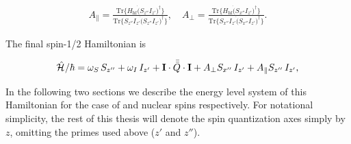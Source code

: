 \begin{align}
    A_\parallel = \frac{\text{Tr}\{ H_\text{hf} \dot (S_{z''}I_{z'})^\dagger\}}{\text{Tr}\{ S_{z''}I_{z'}\dot( S_{z''}I_{z'})^\dagger \}},  \quad A_\perp = \frac{\text{Tr}\{ H_\text{hf} \dot ( S_{x''}I_{z'})^\dagger\}}{\text{Tr}\{  S_{x''}I_{z'}\dot( S_{x''}I_{z'})^\dagger \}}.
\end{align} 

The final spin-1/2 Hamiltonian is

\begin{equation}
    \hat{\mathcal{H}}_{\text{}} / \hbar = \omega_S \, S_{z''} + \omega_I \, I_{z'} + \mathbf{I} \cdot \bar{\bar{Q}} \cdot \mathbf{I} + A_\perp  S_{x''}\,I_{z'} + A_\parallel  S_{z''}\,I_{z'},
\end{equation}

In the following two sections we describe the energy level system of this Hamiltonian for the case of \W and \Nb nuclear spins respectively. For notational simplicity, the rest of this thesis will denote the spin quantization axes simply by $z$, omitting the primes used above ($z'$ and $z''$).




